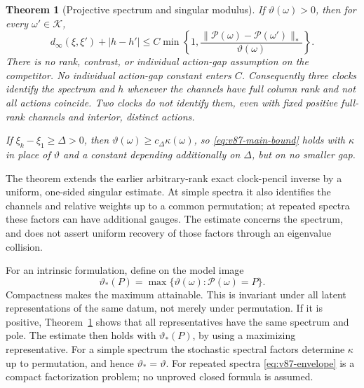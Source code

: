\documentclass[11pt,reqno]{amsart}
\numberwithin{equation}{section}
\newtheorem{theorem}{Theorem}[section]
\theoremstyle{definition}\newtheorem{definition}[theorem]{Definition}
\theoremstyle{remark}\newtheorem{remark}[theorem]{Remark}
\newcommand{\cK}{\mathcal K}
\newcommand{\sig}{\vartheta}
\begin{document}
\begin{theorem}[Projective spectrum and singular modulus]
\label{thm:v87-main}
If $\sig(\omega)>0$, then for every $\omega'\in\cK$,
\begin{equation}\label{eq:v87-main-bound}
 d_\infty(\xi,\xi')+|h-h'|
 \le C\min\left\{1,
          \frac{\|\mathcal P(\omega)-\mathcal P(\omega')\|_*}
               {\sig(\omega)}\right\}.
\end{equation}
There is no rank, contrast, or individual action-gap assumption on the
competitor. No individual action-gap constant enters $C$.
Consequently three clocks identify the spectrum and $h$ whenever the
channels have full column rank and not all actions coincide. Two
clocks do not identify them, even with fixed positive full-rank
channels and interior, distinct actions.

If $\xi_k-\xi_1\ge\Delta>0$, then
$\sig(\omega)\ge c_\Delta\kappa(\omega)$, so
\eqref{eq:v87-main-bound} holds with $\kappa$ in place of $\sig$ and
a constant depending additionally on $\Delta$, but on no smaller gap.
\end{theorem}

The theorem extends the earlier arbitrary-rank exact clock-pencil
inverse by a uniform, one-sided singular estimate. At simple spectra
it also identifies the channels and relative weights up to a common
permutation; at repeated spectra these factors can have additional
gauges. The estimate concerns the spectrum, and does not assert
uniform recovery of those factors through an eigenvalue collision.

For an intrinsic formulation, define on the model image
\begin{equation}\label{eq:v87-envelope}
 \sig_*(P)=\max\{\sig(\omega):\mathcal P(\omega)=P\}.
\end{equation}
Compactness makes the maximum attainable. This is invariant under
all latent representations of the same datum, not merely under
permutation. If it is positive, Theorem~\ref{thm:v87-main} shows that
all representatives have the same spectrum and pole. The estimate
then holds with $\sig_*(P)$, by using a maximizing representative.
For a simple spectrum the stochastic spectral factors determine
$\kappa$ up to permutation, and hence $\sig_* = \sig$.
For repeated spectra \eqref{eq:v87-envelope} is a compact
factorization problem; no unproved closed formula is assumed.
\end{document}
